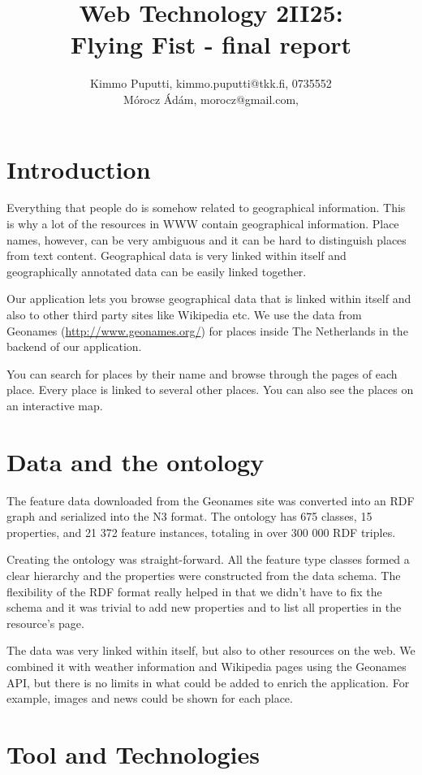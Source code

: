 \documentclass[a4paper,12pt]{article}
\title{Web Technology 2II25:\\Flying Fist - final report}
\author{Kimmo Puputti, kimmo.puputti@tkk.fi, 0735552\\M\'orocz \'Ad\'am, morocz@gmail.com, }
\begin{document}
\maketitle

\section{Introduction}

Everything that people do is somehow related to geographical
information. This is why a lot of the resources in WWW contain
geographical information. Place names, however, can be very ambiguous
and it can be hard to distinguish places from text
content. Geographical data is very linked within itself and
geographically annotated data can be easily linked together.

Our application lets you browse geographical data that is linked
within itself and also to other third party sites like Wikipedia
etc. We use the data from Geonames (\url{http://www.geonames.org/})
for places inside The Netherlands in the backend of our application.

You can search for places by their name and browse through the pages
of each place. Every place is linked to several other places. You can
also see the places on an interactive map.

\section{Data and the ontology}

The feature data downloaded from the Geonames site was converted into
an RDF graph and serialized into the N3 format. The ontology has 675
classes, 15 properties, and 21 372 feature instances, totaling in over
300 000 RDF triples.

Creating the ontology was straight-forward. All the feature type
classes formed a clear hierarchy and the properties were constructed
from the data schema. The flexibility of the RDF format really helped
in that we didn't have to fix the schema and it was trivial to add new
properties and to list all properties in the resource's page.

The data was very linked within itself, but also to other resources on
the web. We combined it with weather information and Wikipedia pages
using the Geonames API, but there is no limits in what could be added
to enrich the application. For example, images and news could be shown
for each place.

\section{Tool and Technologies}
\end{document}
